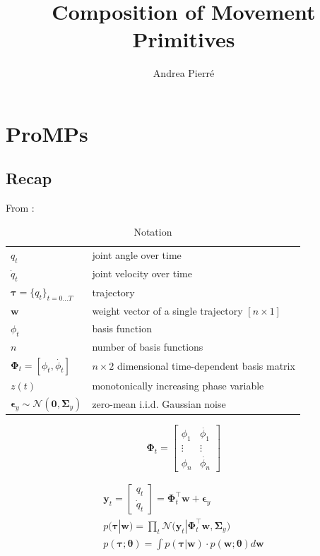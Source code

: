\documentclass{article}
\title{Composition of Movement Primitives}
\author{Andrea Pierré}
\begin{document}
\maketitle


\tableofcontents

\section{ProMPs}
\subsection{Recap}
From \citep{paraschos_probabilistic_2013, paraschos_using_2018}:
\begin{table}
  \centering
  \caption{Notation}
  \begin{tabular}{ll}
    \toprule
    $q_t$ & joint angle over time\\
    $\dot{q}_t$ & joint velocity over time\\
    $\bm{\tau} = \{q_t\}_{t=0\dots T}$ & trajectory\\
    $\bm{w}$ & weight vector of a single trajectory $[n \times 1]$\\
    $\phi_t$ & basis function\\
    $n$ & number of basis functions\\
    $\bm{\Phi}_t = [\phi_t, \dot{\phi_t}]$ & $n \times 2$ dimensional time-dependent basis matrix\\
    $z(t)$ & monotonically increasing phase variable\\
    $\bm{\epsilon}_y \sim \mathcal{N}(\bm{0}, \bm{\Sigma}_y)$ & zero-mean i.i.d. Gaussian noise\\
    \bottomrule
  \end{tabular}
\end{table}

\begin{equation}
  \bm{\Phi}_t =
  \begin{bmatrix}
    \phi_1 & \dot{\phi_1}\\
    \vdots & \vdots\\
    \phi_n & \dot{\phi_n}
  \end{bmatrix}
\end{equation}

\begin{gather}
\bm{y}_t = \begin{bmatrix}
       q_t \\[0.3em]
       \dot{q}_t
     \end{bmatrix} = \bm{\Phi}^{\top}_{t}\bm{w} + \bm{\epsilon}_y\\
p(\bm{\tau}|\bm{w}) = \prod_t \mathcal{N}\Big(\bm{y}_t|\bm{\Phi}^{\top}_{t}\bm{w}, \bm{\Sigma}_y \Big)\\
p(\bm{\tau};\bm{\theta}) = \int p(\bm{\tau}|\bm{w}) \cdot p(\bm{w};\bm{\theta}) d\bm{w}
\end{gather}
\end{document}
